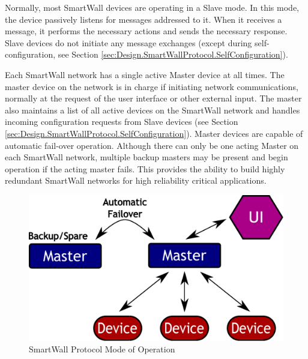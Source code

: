 \documentclass[11pt]{article}
\begin{document}
Normally, most SmartWall devices are operating in a
Slave mode. In this mode, the device passively listens for messages
addressed to it. When it receives a message, it performs the necessary
actions and sends the necessary response. Slave devices do not initiate
any message exchanges (except during self-configuration, see Section
\ref{sec:Design.SmartWallProtocol.SelfConfiguration}).

Each SmartWall network has a single active Master device at all
times. The master device on the network is in charge if initiating network
communications, normally at the request of the user interface or other
external input. The master also maintains a list of all active devices
on the SmartWall network and handles incoming configuration requests
from Slave devices (see Section
\ref{sec:Design.SmartWallProtocol.SelfConfiguration}). Master devices
are capable of automatic fail-over operation. Although there can only
be one acting Master on each SmartWall network, multiple backup masters
may be present and begin operation if the acting master fails. This
provides the ability to build highly redundant SmartWall networks for
high reliability critical applications.

\begin{figure}
  \begin{center}
    \includegraphics[scale=.5]{networkmode.pdf}
  \end{center}
  \caption{SmartWall Protocol Mode of Operation}
  \label{fig:swMode}
\end{figure}
\end{document}
